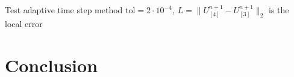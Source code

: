 \documentclass{beamer}
\begin{document}
\begin{frame}{Test adaptive time step method}
  $\text{tol}=2\cdot10^{-4}$, $L = \| U^{n+1}_{[4]} - U^{n+1}_{[3]} \|_2$ is the local error
\end{frame}


\section{Conclusion}
\end{document}

